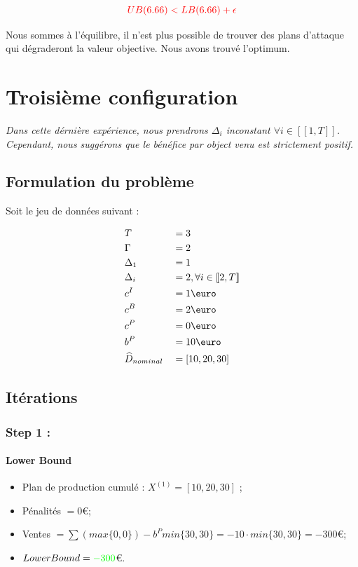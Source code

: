 \documentclass[11pt,a4paper]{article}
\begin{document}
\[
    \textcolor{red}{UB(6.66)<LB(6.66)+\epsilon}
\]

Nous sommes à l'équilibre, il n'est plus possible de trouver des plans d'attaque qui dégraderont la valeur objective. Nous avons trouvé l'optimum.


\section{Troisième configuration}
\label{sec:formulation2}

\textit{Dans cette dérnière expérience, nous prendrons $\Delta_i$ inconstant $\forall i\in[\![1, T]\!]$. Cependant, nous suggérons que le bénéfice par object venu est strictement positif.}


\subsection{Formulation du problème}

Soit le jeu de données suivant :

\begin{alignat}{5}
    &T&&=3\\
    &\Gamma&&=2\\
    &\Delta_1&&=1\\
    &\Delta_i&&=2, \forall i\in[\![2, T]\!]\\
    &c^I&&=1\text{\euro}\\
    &c^B&&=2\text{\euro}\\
    &c^P&&=0\text{\euro}\\
    &b^P&&=10\text{\euro}\\
    &\widehat{D}_{nominal}&&=[10, 20, 30]
\end{alignat}


\subsection{Itérations}


\subsubsection{Step 1 :}

\paragraph{Lower Bound}

\begin{itemize}
    \item Plan de production cumulé : $X^{(1)}=[10, 20, 30]$ ;
    \item Pénalités $=0$\euro ;
    \item Ventes $=\sum (max\{0, 0\}) - b^Pmin\{30, 30\}=- 10\cdot min\{30, 30\}=-300$\euro ;
    \item $LowerBound=\textcolor{green}{-300}$\euro.
\end{itemize}
\end{document}
